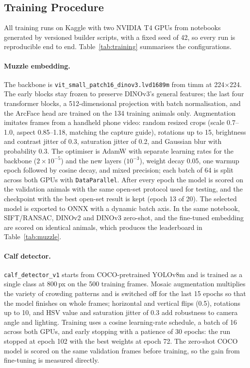 \documentclass[11pt,letterpaper]{article}
\begin{document}
\subsection{Training Procedure}

All training runs on Kaggle with two NVIDIA T4 GPUs from notebooks generated by versioned builder scripts, with a fixed seed of 42, so every run is reproducible end to end. Table~\ref{tab:training} summarises the configurations.

\paragraph{Muzzle embedding.} The backbone is \texttt{vit\_small\_patch16\_dinov3.lvd1689m} from timm at 224$\times$224. The early blocks stay frozen to preserve DINOv3's general features; the last four transformer blocks, a 512-dimensional projection with batch normalisation, and the ArcFace head are trained on the 134 training animals only. Augmentation imitates frames from a handheld phone video: random resized crops (scale 0.7--1.0, aspect 0.85--1.18, matching the capture guide), rotations up to 15\textdegree, brightness and contrast jitter of 0.3, saturation jitter of 0.2, and Gaussian blur with probability 0.3. The optimiser is AdamW with separate learning rates for the backbone ($2\times10^{-5}$) and the new layers ($10^{-3}$), weight decay 0.05, one warmup epoch followed by cosine decay, and mixed precision; each batch of 64 is split across both GPUs with \texttt{DataParallel}. After every epoch the model is scored on the validation animals with the same open-set protocol used for testing, and the checkpoint with the best open-set result is kept (epoch 13 of 20). The selected model is exported to ONNX with a dynamic batch axis. In the same notebook, SIFT/RANSAC, DINOv2 and DINOv3 zero-shot, and the fine-tuned embedding are scored on identical animals, which produces the leaderboard in Table~\ref{tab:muzzle}.

\paragraph{Calf detector.} \texttt{calf\_detector\_v1} starts from COCO-pretrained YOLOv8m and is trained as a single class at 800\,px on the 500 training frames. Mosaic augmentation multiplies the variety of crowding patterns and is switched off for the last 15 epochs so that the model finishes on whole frames; horizontal and vertical flips (0.5), rotations up to 10\textdegree, and HSV value and saturation jitter of 0.3 add robustness to camera angle and lighting. Training uses a cosine learning-rate schedule, a batch of 16 across both GPUs, and early stopping with a patience of 30 epochs: the run stopped at epoch 102 with the best weights at epoch 72. The zero-shot COCO model is scored on the same validation frames before training, so the gain from fine-tuning is measured directly.
\end{document}
